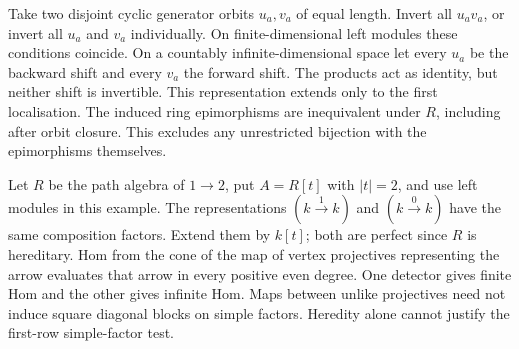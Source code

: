 \documentclass[11pt]{article}
\begin{document}
\begin{ex}
Take two disjoint cyclic generator orbits $u_a,v_a$ of equal length.
Invert all $u_a v_a$, or invert all $u_a$ and $v_a$ individually.
On finite-dimensional left modules these conditions coincide. On a
countably infinite-dimensional space let every $u_a$ be the backward
shift and every $v_a$ the forward shift. The products act as identity,
but neither shift is invertible. This representation extends only to
the first localisation. The induced ring epimorphisms are inequivalent
under $R$, including after orbit closure. This excludes any unrestricted
bijection with the epimorphisms themselves.
\end{ex}

\begin{ex}
Let $R$ be the path algebra of $1\to2$, put $A=R[t]$ with $|t|=2$,
and use left modules in this example. The representations
$(k\xrightarrow{1}k)$ and $(k\xrightarrow{0}k)$ have the same
composition factors. Extend them by $k[t]$; both are perfect since $R$
is hereditary. Hom from the cone of the map of vertex projectives
representing the arrow evaluates that arrow in every positive even
degree. One detector gives finite Hom and the other gives infinite
Hom. Maps between unlike projectives need not induce square diagonal
blocks on simple factors. Heredity alone cannot justify the first-row
simple-factor test.
\end{ex}
\end{document}
